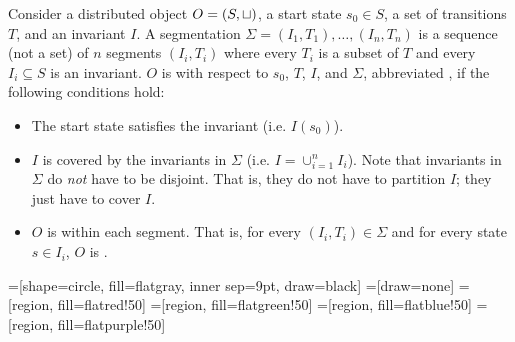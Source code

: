Consider a distributed object $O = (S, \sqcup)$, a start state $s_0 \in S$, a
set of transitions $T$, and an invariant $I$. A segmentation $\Sigma = (I_1,
T_1), \ldots, (I_n, T_n)$ is a sequence (not a set) of $n$ segments $(I_i,
T_i)$ where every $T_i$ is a subset of $T$ and every $I_i \subseteq S$ is an
invariant. $O$ is  with respect to
$s_0$, $T$, $I$, and $\Sigma$, abbreviated , if the
following conditions hold:
\begin{itemize}
  \item
    The start state satisfies the invariant (i.e. $I(s_0)$).

  \item
    $I$ is covered by the invariants in $\Sigma$ (i.e. $I = \cup_{i=1}^n I_i$).
    Note that invariants in $\Sigma$ do \emph{not} have to be disjoint. That
    is, they do not have to partition $I$; they just have to cover $I$.

  \item
    $O$ is \invariantconfluent{} within each segment. That is, for every $(I_i,
    T_i) \in \Sigma$ and for every state $s \in I_i$, $O$ is
    .
\end{itemize}

=[shape=circle, fill=flatgray, inner sep=9pt, draw=black]
=[draw=none]
=[region, fill=flatred!50]
=[region, fill=flatgreen!50]
=[region, fill=flatblue!50]
=[region, fill=flatpurple!50]

\newcommand{\pointgrid}[4]{{
  \newcommand{\argxmin}{#1}
  \newcommand{\argxmax}{#2}
  \newcommand{\argymin}{#3}
  \newcommand{\argymax}{#4}

  \draw[] (\argxmin, 0) to (\argxmax, 0);
  \draw[] (0, \argymin) to (0, \argymax);
  \foreach \x in {\argxmin, ..., \argxmax} {
    \foreach \y in {\argymin, ..., \argymax} {
      \node[point] (\x-\y) at (\x, \y) {};
    }
  }
}}

\newcommand{\subfigwidth}{0.24\columnwidth}
\newcommand{\subfighspace}{0.3cm}
\newcommand{\tikzhspace}{0.4cm}
\newcommand{\tikzscale}{1.5}
\newcommand{\xmin}{-2}
\newcommand{\xmax}{2}
\newcommand{\ymin}{-2}
\newcommand{\ymax}{2}

